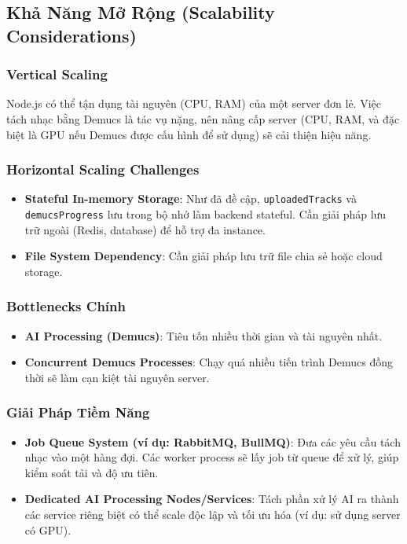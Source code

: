 \documentclass[12pt,a4paper]{article}
\begin{document}
\subsection{Khả Năng Mở Rộng (Scalability Considerations)}
\label{subsec:scalability}

\subsubsection{Vertical Scaling}
Node.js có thể tận dụng tài nguyên (CPU, RAM) của một server đơn lẻ. Việc tách nhạc bằng Demucs là tác vụ nặng, nên nâng cấp server (CPU, RAM, và đặc biệt là GPU nếu Demucs được cấu hình để sử dụng) sẽ cải thiện hiệu năng.

\subsubsection{Horizontal Scaling Challenges}
\begin{itemize}
    \item \textbf{Stateful In-memory Storage}: Như đã đề cập, \texttt{uploadedTracks} và \texttt{demucsProgress} lưu trong bộ nhớ làm backend stateful. Cần giải pháp lưu trữ ngoài (Redis, database) để hỗ trợ đa instance.
    \item \textbf{File System Dependency}: Cần giải pháp lưu trữ file chia sẻ hoặc cloud storage.
\end{itemize}

\subsubsection{Bottlenecks Chính}
\begin{itemize}
    \item \textbf{AI Processing (Demucs)}: Tiêu tốn nhiều thời gian và tài nguyên nhất.
    \item \textbf{Concurrent Demucs Processes}: Chạy quá nhiều tiến trình Demucs đồng thời sẽ làm cạn kiệt tài nguyên server.
\end{itemize}

\subsubsection{Giải Pháp Tiềm Năng}
\begin{itemize}
    \item \textbf{Job Queue System (ví dụ: RabbitMQ, BullMQ)}: Đưa các yêu cầu tách nhạc vào một hàng đợi. Các worker process sẽ lấy job từ queue để xử lý, giúp kiểm soát tải và độ ưu tiên.
    \item \textbf{Dedicated AI Processing Nodes/Services}: Tách phần xử lý AI ra thành các service riêng biệt có thể scale độc lập và tối ưu hóa (ví dụ: sử dụng server có GPU).
\end{itemize}
\end{document}
